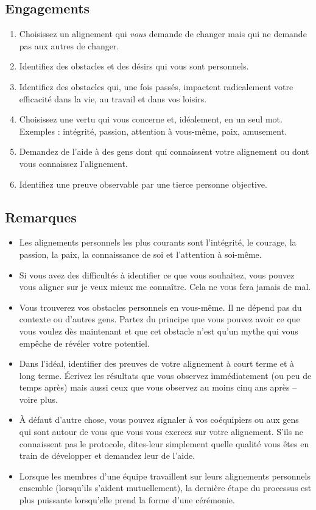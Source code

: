 \documentclass[11pt]{book}
\begin{document}
\subsection{Engagements}
\begin{enumerate}
	\item Choisissez un alignement qui \emph{vous} demande de changer mais qui ne demande pas aux autres de changer.
	\item Identifiez des obstacles et des désirs qui vous sont personnels.
	\item Identifiez des obstacles qui, une fois passés, impactent radicalement votre efficacité dans la vie, au travail et dans vos loisirs.
	\item Choisissez une vertu qui vous concerne et, idéalement, en un seul mot. Exemples : intégrité, passion, attention à vous-même, paix, amusement.
	\item Demandez de l'aide à des gens dont qui connaissent votre alignement ou dont vous connaissez l'alignement.
	\item Identifiez une preuve observable par une tierce personne objective.
\end{enumerate}

\subsection{Remarques}
\begin{itemize}
	\item Les alignements personnels les plus courants sont l'intégrité, le courage, la passion, la paix, la connaissance de soi et l'attention à soi-même.
	\item Si vous avez des difficultés à identifier ce que vous souhaitez, vous pouvez vous aligner sur \og{}je veux mieux me connaître\fg{}. Cela ne vous
	      fera jamais de mal.
	\item Vous trouverez vos obstacles personnels en vous-même. Il ne dépend pas du contexte ou d'autres gens. Partez du principe que vous pouvez avoir ce
	      que vous voulez dès maintenant et que cet obstacle n'est qu'un mythe qui vous empêche de révéler votre potentiel.
	\item Dans l'idéal, identifier des preuves de votre alignement à court terme et à long terme. Écrivez les résultats que vous observez immédiatement (ou
	      peu de temps après) mais aussi ceux que vous observez au moins cinq ans après -- voire plus.
	\item À défaut d'autre chose, vous pouvez signaler à vos coéquipiers ou aux gens qui sont autour de vous que vous vous exercez sur votre alignement.
	      S'ils ne connaissent pas le protocole, dites-leur simplement quelle qualité vous êtes en train de développer et demandez leur de l'aide.
	\item Lorsque les membres d'une équipe travaillent sur leurs alignements personnels ensemble (lorsqu'ils s'aident mutuellement), la dernière étape du
	      processus est plus puissante lorsqu'elle prend la forme d'une cérémonie.
\end{itemize}
\end{document}

